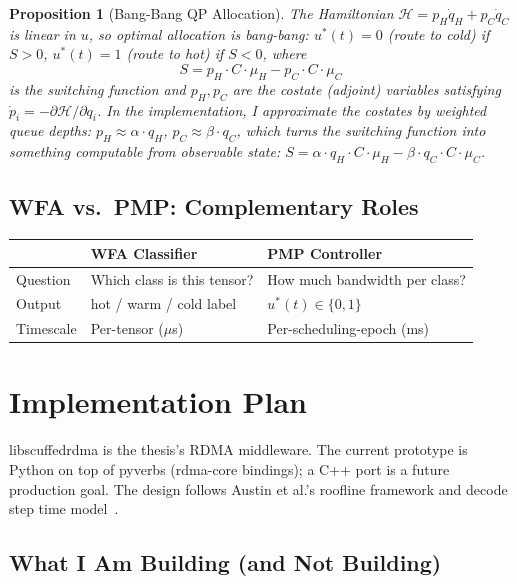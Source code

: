 \documentclass[11pt]{article}
\newtheorem{proposition}{Proposition}
\begin{document}
\begin{proposition}[Bang-Bang QP Allocation]
The Hamiltonian $\mathcal{H} = p_H \dot{q}_H + p_C \dot{q}_C$ is linear in $u$, so optimal allocation is bang-bang:
$u^*(t) = 0$ (route to cold) if $S > 0$, $u^*(t) = 1$ (route to hot) if $S < 0$, where
\[
S = p_H \cdot C \cdot \mu_H - p_C \cdot C \cdot \mu_C
\]
is the switching function and $p_H, p_C$ are the costate (adjoint) variables satisfying $\dot{p}_i = -\partial \mathcal{H}/\partial q_i$. In the implementation, I approximate the costates by weighted queue depths: $p_H \approx \alpha \cdot q_H$, $p_C \approx \beta \cdot q_C$, which turns the switching function into something computable from observable state: $S = \alpha \cdot q_H \cdot C \cdot \mu_H - \beta \cdot q_C \cdot C \cdot \mu_C$.
\end{proposition}

\subsection{WFA vs.\ PMP: Complementary Roles}

\begin{table}[ht]
\centering\small
\begin{tabular}{lll}
\toprule
& \textbf{WFA Classifier} & \textbf{PMP Controller} \\
\midrule
Question & Which class is this tensor? & How much bandwidth per class? \\
Output & hot / warm / cold label & $u^*(t) \in \{0, 1\}$ \\
Timescale & Per-tensor ($\mu$s) & Per-scheduling-epoch (ms) \\
\bottomrule
\end{tabular}
\end{table}

\section{Implementation Plan}

libscuffedrdma is the thesis's RDMA middleware. The current prototype is Python on top of pyverbs (rdma-core bindings); a C++ port is a future production goal. The design follows Austin et al.'s roofline framework and decode step time model~\cite{scaling_book}.

\subsection{What I Am Building (and Not Building)}
\end{document}
